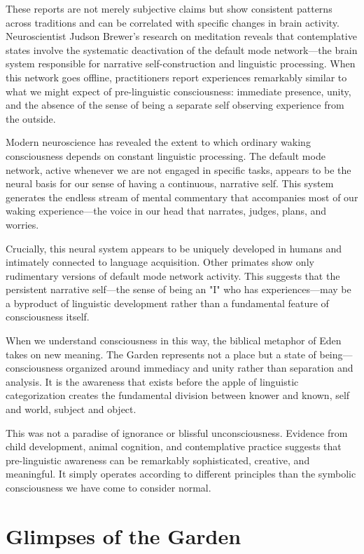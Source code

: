 These reports are not merely subjective claims but show consistent patterns across traditions and can be correlated with specific changes in brain activity. Neuroscientist Judson Brewer's research on meditation reveals that contemplative states involve the systematic deactivation of the default mode network—the brain system responsible for narrative self-construction and linguistic processing. When this network goes offline, practitioners report experiences remarkably similar to what we might expect of pre-linguistic consciousness: immediate presence, unity, and the absence of the sense of being a separate self observing experience from the outside.

Modern neuroscience has revealed the extent to which ordinary waking consciousness depends on constant linguistic processing. The default mode network, active whenever we are not engaged in specific tasks, appears to be the neural basis for our sense of having a continuous, narrative self. This system generates the endless stream of mental commentary that accompanies most of our waking experience—the voice in our head that narrates, judges, plans, and worries.

Crucially, this neural system appears to be uniquely developed in humans and intimately connected to language acquisition. Other primates show only rudimentary versions of default mode network activity. This suggests that the persistent narrative self—the sense of being an "I" who has experiences—may be a byproduct of linguistic development rather than a fundamental feature of consciousness itself.

When we understand consciousness in this way, the biblical metaphor of Eden takes on new meaning. The Garden represents not a place but a state of being—consciousness organized around immediacy and unity rather than separation and analysis. It is the awareness that exists before the apple of linguistic categorization creates the fundamental division between knower and known, self and world, subject and object.

This was not a paradise of ignorance or blissful unconsciousness. Evidence from child development, animal cognition, and contemplative practice suggests that pre-linguistic awareness can be remarkably sophisticated, creative, and meaningful. It simply operates according to different principles than the symbolic consciousness we have come to consider normal.

\section{Glimpses of the Garden}

